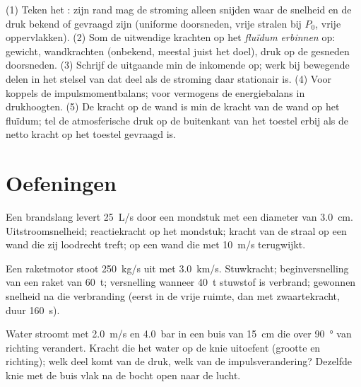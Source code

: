 \begin{method}\label{met:b2:flow-balances:method}
(1) Teken het : zijn rand mag de stroming alleen snijden waar
de snelheid en de druk bekend of gevraagd zijn (uniforme doorsneden, vrije
stralen bij $P_0$, vrije oppervlakken). (2) Som de uitwendige krachten op
het \emph{fluïdum erbinnen} op: gewicht, wandkrachten (onbekend, meestal
juist het doel), druk op de gesneden doorsneden. (3) Schrijf de uitgaande
min de inkomende  op; werk bij bewegende delen in het stelsel van
dat deel als de stroming daar stationair is. (4) Voor koppels de
impulsmomentbalans; voor vermogens de energiebalans in drukhoogten. (5) De
kracht op de wand is min de kracht van de wand op het fluïdum; tel de
atmosferische druk op de buitenkant van het toestel erbij als de netto
kracht op het toestel gevraagd is.
\end{method}

\section{Oefeningen}

\begin{exercise}[$\star$]\label{exo:b2:flow-balances:1}
Een brandslang levert \qty{25}{L/s} door een mondstuk met een diameter van
\qty{3.0}{cm}. Uitstroomsnelheid; reactiekracht op het mondstuk; kracht van
de straal op een wand die zij loodrecht treft; op een wand die met
\qty{10}{m/s} terugwijkt.
\end{exercise}

\begin{exercise}[$\star$]\label{exo:b2:flow-balances:2}
Een raketmotor stoot \qty{250}{kg/s} uit met \qty{3.0}{km/s}. Stuwkracht;
beginversnelling van een raket van \qty{60}{t}; versnelling wanneer
\qty{40}{t} stuwstof is verbrand; gewonnen snelheid na die verbranding
(eerst in de vrije ruimte, dan met zwaartekracht, duur \qty{160}{s}).
\end{exercise}

\begin{exercise}[$\star$]\label{exo:b2:flow-balances:3}
Water stroomt met \qty{2.0}{m/s} en \qty{4.0}{bar} in een buis van
\qty{15}{cm} die over \qty{90}{\degree} van richting verandert. Kracht die
het water op de knie uitoefent (grootte en richting); welk deel komt van de
druk, welk van de impulsverandering? Dezelfde knie met de buis vlak na de
bocht open naar de lucht.
\end{exercise}

